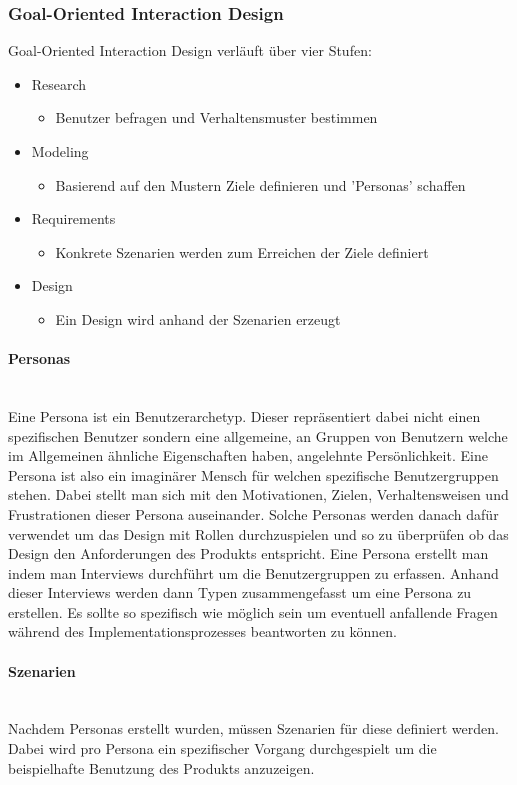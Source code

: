 \documentclass{article}
\newcommand{\paragraphlb}[1]{\paragraph{#1}\mbox{}\\}
\begin{document}
	\subsubsection{Goal-Oriented Interaction Design}
	Goal-Oriented Interaction Design verläuft über vier Stufen:
	\begin{itemize}
		\item{Research}
		\begin{itemize}
			\item{Benutzer befragen und Verhaltensmuster bestimmen}
		\end{itemize}
		\item{Modeling}
		\begin{itemize}
			\item{Basierend auf den Mustern Ziele definieren und 'Personas' schaffen}
		\end{itemize}
		\item{Requirements}
		\begin{itemize}
			\item{Konkrete Szenarien werden zum Erreichen der Ziele definiert}
		\end{itemize}
		\item{Design}
		\begin{itemize}
			\item{Ein Design wird anhand der Szenarien erzeugt}
		\end{itemize}
	\end{itemize}
	\paragraphlb{Personas}
	Eine Persona ist ein Benutzerarchetyp. Dieser repräsentiert dabei nicht einen spezifischen Benutzer sondern eine allgemeine, an Gruppen von Benutzern welche im Allgemeinen ähnliche Eigenschaften haben, angelehnte Persönlichkeit. Eine Persona ist also ein imaginärer Mensch für welchen spezifische Benutzergruppen stehen. Dabei stellt man sich mit den Motivationen, Zielen, Verhaltensweisen und Frustrationen dieser Persona auseinander. Solche Personas werden danach dafür verwendet um das Design mit Rollen durchzuspielen und so zu überprüfen ob das Design den Anforderungen des Produkts entspricht.
	Eine Persona erstellt man indem man Interviews durchführt um die Benutzergruppen zu erfassen. Anhand dieser Interviews werden dann Typen zusammengefasst um eine Persona zu erstellen. Es sollte so spezifisch wie möglich sein um eventuell anfallende Fragen während des Implementationsprozesses beantworten zu können.
	\paragraphlb{Szenarien}
	Nachdem Personas erstellt wurden, müssen Szenarien für diese definiert werden. Dabei wird pro Persona ein spezifischer Vorgang durchgespielt um die beispielhafte Benutzung des Produkts anzuzeigen. \\
\end{document}
